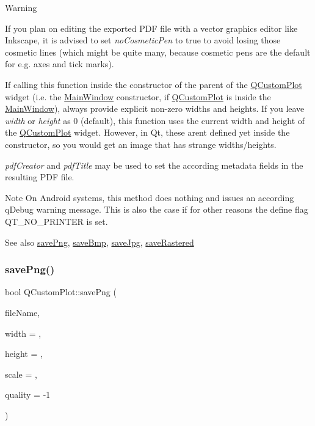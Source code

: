\begin{DoxyWarning}{Warning}
\begin{DoxyItemize}
\item If you plan on editing the exported P\+DF file with a vector graphics editor like Inkscape, it is advised to set {\itshape no\+Cosmetic\+Pen} to true to avoid losing those cosmetic lines (which might be quite many, because cosmetic pens are the default for e.\+g. axes and tick marks). \item If calling this function inside the constructor of the parent of the \mbox{\hyperlink{class_q_custom_plot}{Q\+Custom\+Plot}} widget (i.\+e. the \mbox{\hyperlink{class_main_window}{Main\+Window}} constructor, if \mbox{\hyperlink{class_q_custom_plot}{Q\+Custom\+Plot}} is inside the \mbox{\hyperlink{class_main_window}{Main\+Window}}), always provide explicit non-\/zero widths and heights. If you leave {\itshape width} or {\itshape height} as 0 (default), this function uses the current width and height of the \mbox{\hyperlink{class_q_custom_plot}{Q\+Custom\+Plot}} widget. However, in Qt, these aren\textquotesingle{}t defined yet inside the constructor, so you would get an image that has strange widths/heights.\end{DoxyItemize}
{\itshape pdf\+Creator} and {\itshape pdf\+Title} may be used to set the according metadata fields in the resulting P\+DF file.
\end{DoxyWarning}
\begin{DoxyNote}{Note}
On Android systems, this method does nothing and issues an according q\+Debug warning message. This is also the case if for other reasons the define flag Q\+T\+\_\+\+N\+O\+\_\+\+P\+R\+I\+N\+T\+ER is set.
\end{DoxyNote}
\begin{DoxySeeAlso}{See also}
\mbox{\hyperlink{class_q_custom_plot_a7636261aff1f6d25c9da749ece3fc8b8}{save\+Png}}, \mbox{\hyperlink{class_q_custom_plot_a6629d9e8e6da4bf18055ee0257fdce9a}{save\+Bmp}}, \mbox{\hyperlink{class_q_custom_plot_a490c722092d1771e8ce4a7a73dfd84ab}{save\+Jpg}}, \mbox{\hyperlink{class_q_custom_plot_ab528b84cf92baabe29b1d0ef2f77c93e}{save\+Rastered}} 
\end{DoxySeeAlso}
\mbox{\label{class_q_custom_plot_a7636261aff1f6d25c9da749ece3fc8b8}} 
\subsubsection{\texorpdfstring{save\+Png()}{savePng()}}
{\footnotesize\ttfamily bool Q\+Custom\+Plot\+::save\+Png (\begin{DoxyParamCaption}\item[{const Q\+String \&}]{file\+Name,  }\item[{int}]{width = {},  }\item[{int}]{height = {},  }\item[{double}]{scale = {},  }\item[{int}]{quality = {\ttfamily -\/1} }\end{DoxyParamCaption})}

